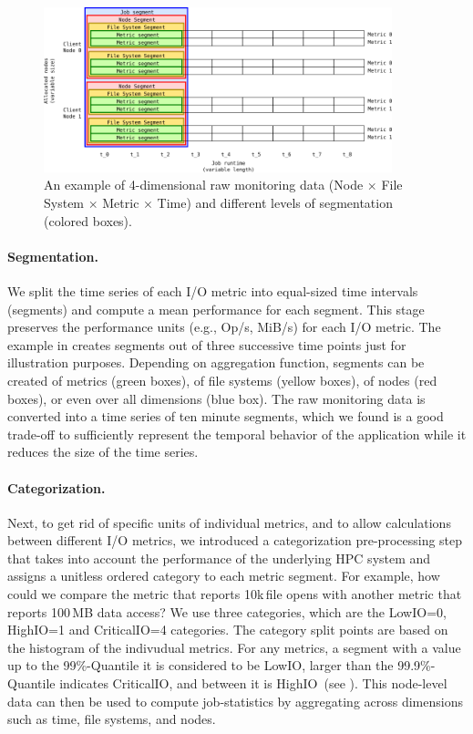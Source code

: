 \documentclass{jhps}
\begin{document}
\begin{figure}[bt]
 \centering
 \includegraphics[width=0.9\textwidth]{assets/stats3.png}
 \caption{An example of 4-dimensional raw monitoring data (Node $\times$ File System $\times$ Metric $\times$ Time) and different levels of segmentation (colored boxes).}%
 \label{fig:generic_example}
\end{figure}

\paragraph{Segmentation.}
We split the time series of each I/O metric into equal-sized time intervals (segments) and compute a mean performance for each segment.
This stage preserves the performance units (e.g., Op/s, MiB/s) for each I/O metric.
The example in  creates segments out of three successive time points just for illustration purposes.
Depending on aggregation function, segments can be created of metrics (green boxes), of file systems (yellow boxes), of nodes (red boxes), or even over all dimensions (blue box).
The raw monitoring data is converted into a time series of ten minute segments, which we found is a good trade-off to sufficiently represent the temporal behavior of the application while it reduces the size of the time series.

\paragraph{Categorization.}
Next, to get rid of specific units of individual metrics, and to allow calculations between different I/O metrics, we introduced a categorization pre-processing step that takes into account the performance of the underlying HPC system and assigns a unitless ordered category to each metric segment.
For example, how could we compare the metric that reports 10k\,file opens with another metric that reports 100\,MB data access?
We use three categories, which are the LowIO=0, HighIO=1 and CriticalIO=4 categories.
The category split points are based on the histogram of the indivudual metrics.
For any metrics, a segment with a value up to the 99\%-Quantile it is considered to be LowIO, larger than the 99.9\%-Quantile indicates CriticalIO, and between it is HighIO~(see \cite{iocats2020}).
This node-level data can then be used to compute job-statistics by aggregating across dimensions such as time, file systems, and nodes.
\end{document}
